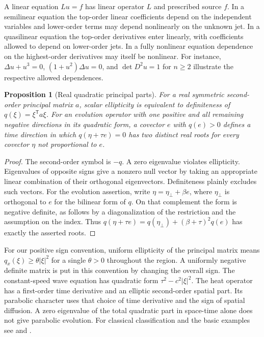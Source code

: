 \documentclass[11pt,oneside,openany]{book}
\theoremstyle{plain}
\newtheorem{proposition}[theorem]{Proposition}
\theoremstyle{definition}
\theoremstyle{remark}
\begin{document}
A linear equation \(Lu=f\) has linear operator \(L\) and prescribed
source \(f\). In a semilinear equation the top-order linear
coefficients depend on the independent variables and lower-order
terms may depend nonlinearly on the unknown jet. In a quasilinear
equation the top-order derivatives enter linearly, with coefficients
allowed to depend on lower-order jets. In a fully nonlinear equation
dependence on the highest-order derivatives may itself be nonlinear.
For instance, \(\Delta u+u^3=0\), \((1+u^2)\Delta u=0\), and
\(\det D^2u=1\) for \(n\ge2\) illustrate the respective allowed
dependences.

\begin{proposition}[Real quadratic principal parts]
\label{prop:pde-symbol-types}
For a real symmetric second-order principal matrix \(a\), scalar
ellipticity is equivalent to definiteness of \(q(\xi)=\xi^{\mathsf T}a\xi\).
For an evolution operator with one positive and all remaining negative
directions in its quadratic form, a covector \(e\) with \(q(e)>0\)
defines a time direction in which \(q(\eta+\tau e)=0\) has two
distinct real roots for every covector \(\eta\) not proportional to \(e\).
\end{proposition}
\begin{proof}
The second-order symbol is \(-q\). A zero eigenvalue violates
ellipticity. Eigenvalues of opposite signs give a nonzero null
vector by taking an appropriate linear combination of their
orthogonal eigenvectors. Definiteness plainly excludes such vectors.
For the evolution assertion, write \(\eta=\eta_\perp+\beta e\),
where \(\eta_\perp\) is orthogonal to \(e\) for the bilinear form
of \(q\). On that complement the form is negative definite,
as follows by a diagonalization of the restriction and the
assumption on the index. Thus
\(q(\eta+\tau e)=q(\eta_\perp)+(\beta+\tau)^2q(e)\)
has exactly the asserted roots.
\end{proof}

For our positive sign convention, uniform ellipticity of the
principal matrix means \(q_x(\xi)\ge\theta|\xi|^2\) for a single
\(\theta>0\) throughout the region. A uniformly negative definite
matrix is put in this convention by changing the overall sign.
The constant-speed wave equation
has quadratic form \(\tau^2-c^2|\xi|^2\). The heat operator has a
first-order time derivative and an elliptic second-order spatial
part. Its parabolic character uses that choice of time derivative
and the sign of spatial diffusion. A zero eigenvalue of the total
quadratic part in space-time alone does not give parabolic evolution.
For classical classification and the basic examples see
\cite[Sections 1.1--1.3]{Evans} and \cite[Chapter 1]{Strauss}.
\end{document}
